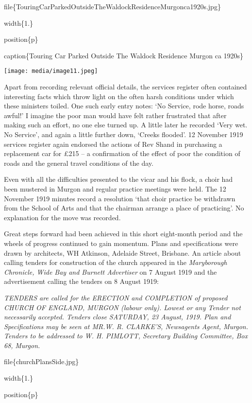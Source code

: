 file\{TouringCarParkedOutsideTheWaldockResidenceMurgonca1920s.jpg\}

width\{1.\}

position\{p\}

caption\{Touring Car Parked Outside The Waldock Residence Murgon ca 1920s\}

\texttt{[image: media/image11.jpeg]}

Apart from recording relevant official details, the services register often contained interesting facts which throw light on the often harsh conditions under which these ministers toiled. One such early entry notes: `No Service, rode horse, roads awful!' I imagine the poor man would have felt rather frustrated that after making such an effort, no one else turned up. A little later he recorded `Very wet. No Service', and again a little further down, `Creeks flooded'. 12 November 1919 services register again endorsed the actions of Rev Shand in purchasing a replacement car for £215 -- a confirmation of the effect of poor the condition of roads and the general travel conditions of the day.

Even with all the difficulties presented to the vicar and his flock, a choir had been mustered in Murgon and regular practice meetings were held. The 12 November 1919 minutes record a resolution `that choir practice be withdrawn from the School of Arts and that the chairman arrange a place of practicing'. No explanation for the move was recorded.

Great steps forward had been achieved in this short eight-month period and the wheels of progress continued to gain momentum. Plans and specifications were drawn by architects, WH Atkinson, Adelaide Street, Brisbane. An article about calling tenders for construction of the church appeared in the \emph{Maryborough Chronicle, Wide Bay and Burnett Advertiser} on 7 August 1919 and the advertisement calling the tenders on 8 August 1919:

\emph{TENDERS are called for the ERECTION and COMPLETION of proposed CHURCH OF ENGLAND, MURGON (labour only). Lowest or any Tender not necessarily accepted. Tenders close SATURDAY, 23 August, 1919. Plan and Specifications may be seen at MR.W. R. CLARKE'S, Newsagents Agent, Murgon. Tenders to be addressed to W. H. PIMLOTT, Secretary Building Committee, Box 68,} \emph{Murgon.}

file\{churchPlansSide.jpg\}

width\{1.\}

position\{p\}

